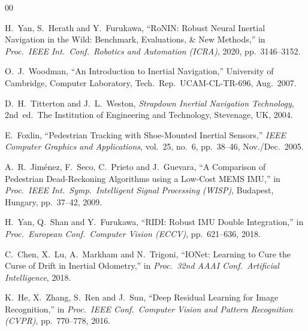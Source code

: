 \documentclass[10pt,conference,letterpaper]{IEEEtran}
\begin{document}


\begin{thebibliography}{00}

H.~Yan, S.~Herath and Y.~Furukawa,
``RoNIN: Robust Neural Inertial Navigation in the Wild: Benchmark,
Evaluations, \& New Methods,''
in \textit{Proc.\ IEEE Int.\ Conf.\ Robotics and Automation (ICRA)},
2020, pp.~3146--3152.

O.~J.\ Woodman,
``An Introduction to Inertial Navigation,''
University of Cambridge, Computer Laboratory,
Tech.\ Rep.\ UCAM-CL-TR-696, Aug.\ 2007.

D.~H.\ Titterton and J.~L.\ Weston,
\textit{Strapdown Inertial Navigation Technology},
2nd~ed.\ The Institution of Engineering and Technology,
Stevenage, UK, 2004.

E.\ Foxlin,
``Pedestrian Tracking with Shoe-Mounted Inertial Sensors,''
\textit{IEEE Computer Graphics and Applications},
vol.~25, no.~6, pp.~38--46, Nov./Dec.\ 2005.

A.~R.\ Jim\'{e}nez, F.\ Seco, C.\ Prieto and J.\ Guevara,
``A Comparison of Pedestrian Dead-Reckoning Algorithms
using a Low-Cost MEMS IMU,''
in \textit{Proc.\ IEEE Int.\ Symp.\ Intelligent Signal
Processing (WISP)}, Budapest, Hungary, pp.~37--42, 2009.

H.\ Yan, Q.\ Shan and Y.\ Furukawa,
``RIDI: Robust IMU Double Integration,''
in \textit{Proc.\ European Conf.\ Computer Vision (ECCV)},
pp.\ 621--636, 2018.

C.\ Chen, X.\ Lu, A.\ Markham and N.\ Trigoni,
``IONet: Learning to Cure the Curse of Drift in Inertial Odometry,''
in \textit{Proc.\ 32nd AAAI Conf.\ Artificial Intelligence},
2018.

K.\ He, X.\ Zhang, S.\ Ren and J.\ Sun,
``Deep Residual Learning for Image Recognition,''
in \textit{Proc.\ IEEE Conf.\ Computer Vision and Pattern
Recognition (CVPR)}, pp.\ 770--778, 2016.


\end{thebibliography}
\end{document}
